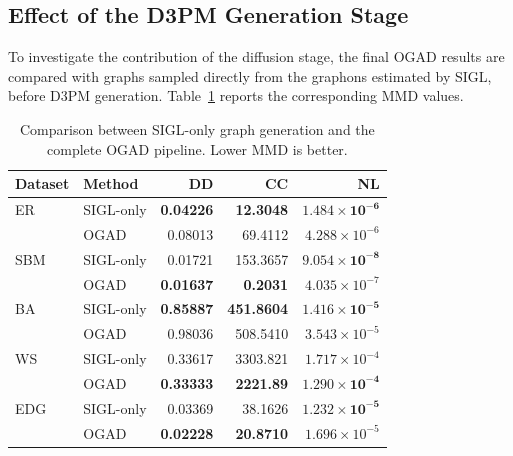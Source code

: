 \subsection{Effect of the D3PM Generation Stage}
\label{subsec:exp_sigl_vs_ogad}

To investigate the contribution of the diffusion stage, the final OGAD results are compared with graphs sampled directly from the graphons estimated by SIGL, before D3PM generation. Table~\ref{tab:exp_sigl_vs_ogad} reports the corresponding MMD values.

\begin{table}[htbp]
    \centering
    \caption{Comparison between SIGL-only graph generation and the complete OGAD pipeline. Lower MMD is better.}
    \label{tab:exp_sigl_vs_ogad}
    \begin{tabular}{llrrr}
        \hline
        Dataset & Method & DD & CC & NL \\
        \hline

        ER
        & SIGL-only
        & \textbf{0.04226}
        & \textbf{12.3048}
        & \(\mathbf{1.484\times10^{-6}}\) \\

        &
        OGAD
        & 0.08013
        & 69.4112
        & \(4.288\times10^{-6}\) \\

        \hline

        SBM
        & SIGL-only
        & 0.01721
        & 153.3657
        & \(\mathbf{9.054\times10^{-8}}\) \\

        &
        OGAD
        & \textbf{0.01637}
        & \textbf{0.2031}
        & \(4.035\times10^{-7}\) \\

        \hline

        BA
        & SIGL-only
        & \textbf{0.85887}
        & \textbf{451.8604}
        & \(\mathbf{1.416\times10^{-5}}\) \\

        &
        OGAD
        & 0.98036
        & 508.5410
        & \(3.543\times10^{-5}\) \\

        \hline

        WS
        & SIGL-only
        & 0.33617
        & 3303.821
        & \(1.717\times10^{-4}\) \\

        &
        OGAD
        & \textbf{0.33333}
        & \textbf{2221.89}
        & \(\mathbf{1.290\times10^{-4}}\) \\

        \hline

        EDG
        & SIGL-only
        & 0.03369
        & 38.1626
        & \(\mathbf{1.232\times10^{-5}}\) \\

        &
        OGAD
        & \textbf{0.02228}
        & \textbf{20.8710}
        & \(1.696\times10^{-5}\) \\

        \hline
    \end{tabular}
\end{table}

